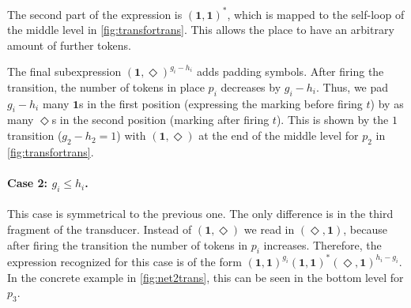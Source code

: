 The second part of the expression is $(\bm{1},\bm{1})^{\bm{*}}$, which is mapped to the self-loop of the middle level in \autoref{fig:transfortrans}. This allows the place to have an arbitrary amount of further tokens. 

The final subexpression $(\bm{1},\Diamond)^{g_{i}-h_{i}}$ adds padding symbols. After firing the transition, the number of tokens in place $p_{i}$ decreases by $g_{i}-h_{i}$. Thus, we pad $g_{i}-h_{i}$ many $\bm{1}$s in the first position (expressing the marking before firing $t$) by as many $\Diamond$s in the second position (marking after firing $t$). This is shown by the $1$ transition ($g_{2}-h_{2} = 1$) with $(\bm{1},\Diamond)$ at the end of the middle level for $p_{2}$ in \autoref{fig:transfortrans}.

\paragraph{Case 2: $g_{i} \le h_{i}$.}
This case is symmetrical to the previous one. The only difference is in the third fragment of the transducer. Instead of $(\bm{1},\Diamond)$ we read in $(\Diamond,\bm{1})$, because after firing the transition the number of tokens in $p_{i}$ increases. Therefore, the expression recognized for this case is of the form $(\bm{1},\bm{1})^{g_{i}}(\bm{1},\bm{1})^{\bm{*}}(\Diamond,\bm{1})^{h_{i}-g_{i}}$. In the concrete example in \autoref{fig:net2trans}, this can be seen in the bottom level for $p_{3}$.



